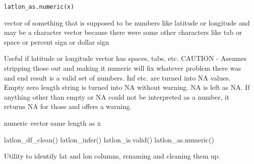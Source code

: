 \documentclass[a4paper]{book}
\begin{document}
%
\begin{Usage}
\begin{verbatim}
latlon_as.numeric(x)
\end{verbatim}
\end{Usage}
%
\begin{Arguments}
\begin{ldescription}
\item[\code{x}] vector of something that is supposed to be numbers like latitude or longitude
and may be a character vector because there were some other characters like tab or space or percent sign or dollar sign
\end{ldescription}
\end{Arguments}
%
\begin{Details}\relax
Useful if latitude or longitude vector has spaces, tabs, etc.
CAUTION - Assumes stripping those out and making it numeric will fix whatever problem there was
and end result is a valid set of numbers. Inf etc. are turned into NA values.
Empty zero length string is turned into NA without warning. NA is left as NA.
If anything other than empty or NA could not be interpreted as a number, it
returns NA for those and offers a warning.
\end{Details}
%
\begin{Value}
numeric vector same length as x
\end{Value}
%
\begin{SeeAlso}\relax
latlon\_df\_clean() latlon\_infer() latlon\_is.valid() latlon\_as.numeric()
\end{SeeAlso}
%
\begin{Examples}
\end{Examples}
%
\begin{Description}\relax
Utility to identify lat and lon columns, renaming and cleaning them up.
\end{Description}
\end{document}
